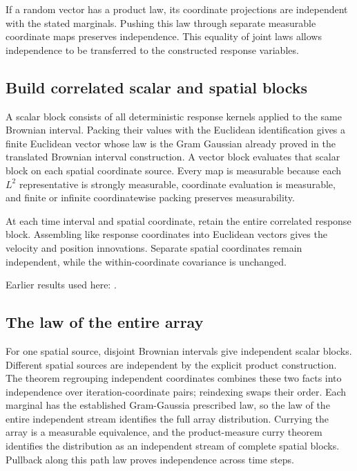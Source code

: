 \documentclass[11pt,a4paper]{report}
\begin{document}
If a random vector has a product law, its coordinate projections are independent with the stated marginals. Pushing this law through separate measurable coordinate maps preserves independence. This equality of joint laws allows independence to be transferred to the constructed response variables.

\subsection{\texorpdfstring{Build correlated scalar and spatial blocks}{Build correlated scalar and spatial blocks}}
\label{report-step-KineticLangevin-CanonicalVectorSegments-lean-2}


A scalar block consists of all deterministic response kernels applied to the same Brownian interval. Packing their values with the Euclidean identification gives a finite Euclidean vector whose law is the Gram Gaussian already proved in the translated Brownian interval construction. A vector block evaluates that scalar block on each spatial coordinate source. Every map is measurable because each \(L^{2}\) representative is strongly measurable, coordinate evaluation is measurable, and finite or infinite coordinatewise packing preserves measurability.



At each time interval and spatial coordinate, retain the entire correlated response block. Assembling like response coordinates into Euclidean vectors gives the velocity and position innovations. Separate spatial coordinates remain independent, while the within-coordinate covariance is unchanged.



Earlier results used here: \cite[Section~3.8.16]{LangevinLean2026ULASC}.
\subsection{\texorpdfstring{The law of the entire array}{The law of the entire array}}
\label{report-step-KineticLangevin-CanonicalVectorSegments-lean-3}


For one spatial source, disjoint Brownian intervals give independent scalar blocks. Different spatial sources are independent by the explicit product construction. The theorem regrouping independent coordinates combines these two facts into independence over iteration-coordinate pairs; reindexing swaps their order. Each marginal has the established Gram-Gaussia prescribed law, so the law of the entire independent stream identifies the full array distribution. Currying the array is a measurable equivalence, and the product-measure curry theorem identifies the distribution as an independent stream of complete spatial blocks. Pullback along this path law proves independence across time steps.
\end{document}
